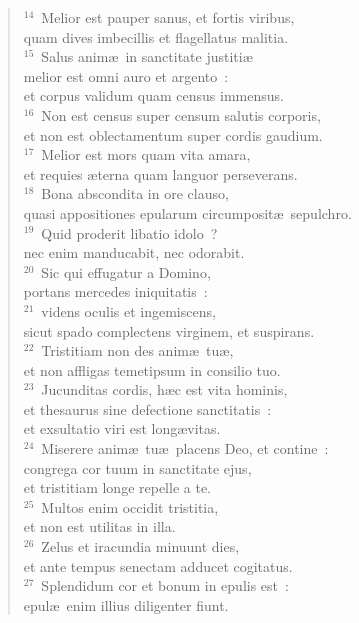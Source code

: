 \begin{flushleft}\begin{verse}${}^{14}$~Melior est pauper sanus, et fortis viribus,\\ quam dives imbecillis et flagellatus malitia.\\
${}^{15}$~Salus anim\ae\ in sanctitate justiti\ae \\ melior est omni auro et argento~:\\ et corpus validum quam census immensus.\\
${}^{16}$~Non est census super censum salutis corporis,\\ et non est oblectamentum super cordis gaudium.\\
${}^{17}$~Melior est mors quam vita amara,\\ et requies \ae terna quam languor perseverans.\\
${}^{18}$~Bona abscondita in ore clauso,\\ quasi appositiones epularum circumposit\ae\ sepulchro.\\
${}^{19}$~Quid proderit libatio idolo~?\\ nec enim manducabit, nec odorabit.\\
${}^{20}$~Sic qui effugatur a Domino,\\ portans mercedes iniquitatis~:\\
${}^{21}$~videns oculis et ingemiscens,\\ sicut spado complectens virginem, et suspirans.\\
${}^{22}$~Tristitiam non des anim\ae\ tu\ae ,\\ et non affligas temetipsum in consilio tuo.\\
${}^{23}$~Jucunditas cordis, h\ae c est vita hominis,\\ et thesaurus sine defectione sanctitatis~:\\ et exsultatio viri est long\ae vitas.\\
${}^{24}$~Miserere anim\ae\ tu\ae\ placens Deo, et contine~:\\ congrega cor tuum in sanctitate ejus,\\ et tristitiam longe repelle a te.\\
${}^{25}$~Multos enim occidit tristitia,\\ et non est utilitas in illa.\\
${}^{26}$~Zelus et iracundia minuunt dies,\\ et ante tempus senectam adducet cogitatus.\\
${}^{27}$~Splendidum cor et bonum in epulis est~:\\ epul\ae\ enim illius diligenter fiunt.\end{verse}\end{flushleft}


